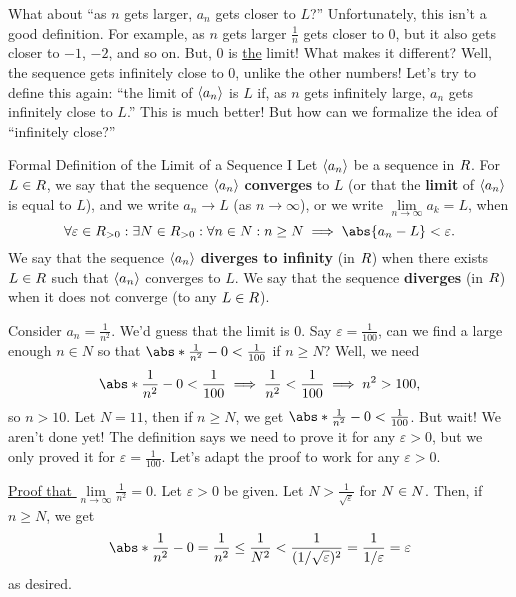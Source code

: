 What about ``as $ n $ gets larger, $ a_n $ gets closer to $ L $?'' Unfortunately, this isn't a good definition. For example, as $ n $
gets larger $ \frac{1}{n} $ gets closer to $ 0 $, but it also gets closer to $ -1 $, $ -2 $, and so on. But, $ 0 $
is \underline{the} limit! What makes it different? Well, the sequence gets infinitely close to $ 0 $,
unlike the other numbers! Let's try to define this again: ``the limit of $ \langle a_n\rangle $ is $ L $
if, as $ n $ gets infinitely large, $ a_n $ gets infinitely close to $ L $.'' This is much better!
But how can we formalize the idea of ``infinitely close?''
\begin{Definition}{Formal Definition of the Limit of a Sequence I}{}
    Let $ \langle a_n\rangle $ be a sequence in $ \relax{R} $. For $ L\in\relax{R} $, we say that the sequence $ \langle a_n\rangle $ \textbf{converges} to $ L $
    (or that the \textbf{limit} of $ \langle a_n\rangle $ is equal to $ L $), and we write $ a_n\to L $ (as $ n\to\infty $), or we write
    $ \lim\limits_{{n} \to {\infty}}a_k=L $, when
    \[ \forall \varepsilon\in\R_{>0}: \exists N\in \R_{>0}:\forall n\in\N:n\ge N\implies \abs{a_n-L}<\varepsilon. \]
    We say that the sequence $ \langle a_n\rangle $ \textbf{diverges to infinity}
    (in $ \relax{R} $) when there exists $ L\in \relax{R} $ such that $ \langle a_n\rangle $ converges to $ L $.
    We say that the sequence \textbf{diverges} (in $ \relax{R} $) when it does not converge (to any $ L\in\relax{R} $).
\end{Definition}
\begin{Example}{}{}
    Consider $ a_n=\frac{1}{n^2} $. We'd guess that the limit is $ 0 $. Say $ \varepsilon=\frac{1}{100} $, can we find a large enough $ n\in N $
    so that $ \abs*{\frac{1}{n^2}-0}<\frac{1}{100}  $ if $ n\ge N $? Well, we need
    \[ \abs*{\frac{1}{n^2}-0}<\frac{1}{100}\implies \frac{1}{n^2}<\frac{1}{100}\implies n^2>100, \]
    so $ n>10 $. Let $ N=11 $, then if $ n\ge N $, we get
    $ \abs*{\frac{1}{n^2}-0}<\frac{1}{100} $. But wait! We aren't done yet! The definition says we need to prove it for any $ \varepsilon>0 $,
    but we only proved it for $ \varepsilon=\frac{1}{100} $. Let's adapt the proof to work for any $ \varepsilon>0 $.
\end{Example}
\underline{Proof that $ \lim\limits_{{n} \to {\infty}}\frac{1}{n^2}=0 $}.
Let $ \varepsilon>0 $ be given. Let $ N>\frac{1}{\sqrt{\varepsilon}} $ for $ N\in \relax{N} $. Then, if $ n\ge N $,
we get
\[ \abs*{\frac{1}{n^2}-0}=\frac{1}{n^2}\le \frac{1}{N^2}<\frac{1}{(1/\sqrt{\varepsilon})^2}=\frac{1}{1/\varepsilon}=\varepsilon \]
as desired.

